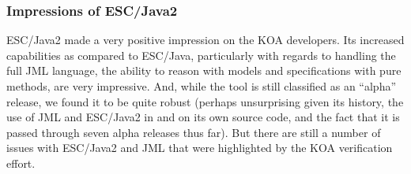 \documentclass{llncs}
\begin{document}
\subsubsection{Impressions of ESC/Java2}

ESC/Java2 made a very positive impression on the KOA developers.  Its
increased capabilities as compared to ESC/Java, particularly with
regards to handling the full JML language, the ability to reason with
models and specifications with pure methods, are very impressive.
And, while the tool is still classified as an ``alpha'' release, we
found it to be quite robust (perhaps unsurprising given its history,
the use of JML and ESC/Java2 in and on its own source code, and the
fact that it is passed through seven alpha releases thus far).  But
there are still a number of issues with ESC/Java2 and JML that were
highlighted by the KOA verification effort.
\end{document}
